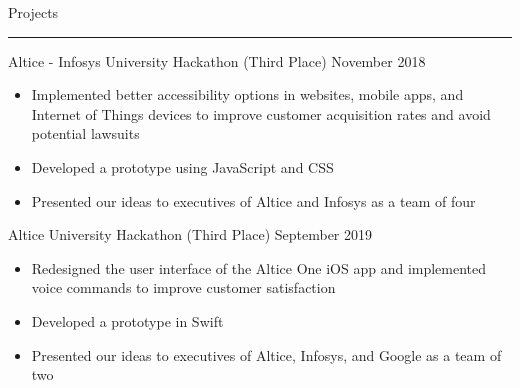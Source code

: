\documentclass{article}
\begin{document}
\noindent
\huge Projects\par
\vspace{0.1em}
\hrule
\Large
\vspace{1em}
\noindent
Altice - Infosys University Hackathon (Third Place)
\hfill
November 2018\\
\vspace{-1em}
\begin{itemize}
\item Implemented better accessibility options in websites, mobile apps, and Internet of Things devices to improve customer acquisition rates and avoid potential lawsuits
\item Developed a prototype using JavaScript and CSS
\item Presented our ideas to executives of Altice and Infosys as a team of four
\end{itemize}

\noindent
Altice University Hackathon (Third Place)
\hfill
September 2019\\
\vspace{-1em}
\begin{itemize}
\item Redesigned the user interface of the Altice One iOS app and implemented voice commands to improve customer satisfaction
\item Developed a prototype in Swift
\item Presented our ideas to executives of Altice, Infosys, and Google as a team of two
\end{itemize}
\end{document}

